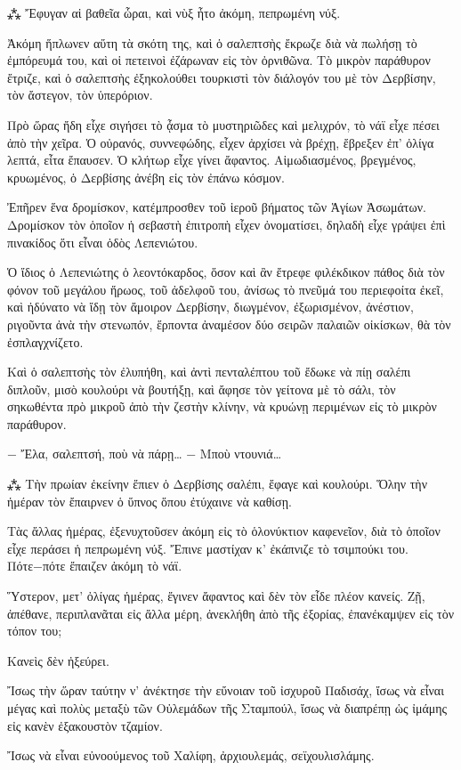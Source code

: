 \documentclass{article}
\begin{document}
⁂
Ἔφυγαν αἱ βαθεῖα ὧραι, καὶ νὺξ ἦτο ἀκόμη, πεπρωμένη νύξ.

Ἀκόμη ἥπλωνεν αὕτη τὰ σκότη της, καὶ ὁ σαλεπτσὴς ἔκρωζε διὰ νὰ πωλήσῃ τὸ ἐμπόρευμά του, καὶ οἱ πετεινοὶ ἐζάρωναν εἰς τὸν ὀρνιθῶνα. Τὸ μικρὸν παράθυρον ἔτριζε, καὶ ὁ σαλεπτσὴς ἐξηκολούθει τουρκιστὶ τὸν διάλογόν του μὲ τὸν Δερβίσην, τὸν ἄστεγον, τὸν ὑπερόριον.

Πρὸ ὥρας ἤδη εἶχε σιγήσει τὸ ᾆσμα τὸ μυστηριῶδες καὶ μελιχρόν, τὸ νάϊ εἶχε πέσει ἀπὸ τὴν χεῖρα. Ὁ οὐρανός, συννεφώδης, εἶχεν ἀρχίσει νὰ βρέχῃ, ἔβρεξεν ἐπ' ὀλίγα λεπτά, εἶτα ἔπαυσεν. Ὁ κλήτωρ εἶχε γίνει ἄφαντος. Αἱμωδιασμένος, βρεγμένος, κρυωμένος, ὁ Δερβίσης ἀνέβη εἰς τὸν ἐπάνω κόσμον.

Ἐπῆρεν ἕνα δρομίσκον, κατέμπροσθεν τοῦ ἱεροῦ βήματος τῶν Ἁγίων Ἀσωμάτων. Δρομίσκον τὸν ὁποῖον ἡ σεβαστὴ ἐπιτροπὴ εἶχεν ὀνοματίσει, δηλαδὴ εἶχε γράψει ἐπὶ πινακίδος ὅτι εἶναι ὁδὸς Λεπενιώτου.

Ὁ ἴδιος ὁ Λεπενιώτης ὁ λεοντόκαρδος, ὅσον καὶ ἂν ἔτρεφε φιλέκδικον πάθος διὰ τὸν φόνον τοῦ μεγάλου ἥρωος, τοῦ ἀδελφοῦ του, ἀνίσως τὸ πνεῦμά του περιεφοίτα ἐκεῖ, καὶ ἠδύνατο νὰ ἴδῃ τὸν ἄμοιρον Δερβίσην, διωγμένον, ἐξωρισμένον, ἀνέστιον, ριγοῦντα ἀνὰ τὴν στενωπόν, ἕρποντα ἀναμέσον δύο σειρῶν παλαιῶν οἰκίσκων, θὰ τὸν ἐσπλαγχνίζετο.

Καὶ ὁ σαλεπτσὴς τὸν ἐλυπήθη, καὶ ἀντὶ πενταλέπτου τοῦ ἔδωκε νὰ πίῃ σαλέπι διπλοῦν, μισὸ κουλούρι νὰ βουτήξῃ, καὶ ἄφησε τὸν γείτονα μὲ τὸ σάλι, τὸν σηκωθέντα πρὸ μικροῦ ἀπὸ τὴν ζεστὴν κλίνην, νὰ κρυώνῃ περιμένων εἰς τὸ μικρὸν παράθυρον.

− Ἔλα, σαλεπτσή, ποὺ νὰ πάρῃ…
− Μποὺ ντουνιά…

⁂
Τὴν πρωίαν ἐκείνην ἔπιεν ὁ Δερβίσης σαλέπι, ἔφαγε καὶ κουλούρι. Ὅλην τὴν ἡμέραν τὸν ἔπαιρνεν ὁ ὕπνος ὅπου ἐτύχαινε νὰ καθίσῃ.

Τὰς ἄλλας ἡμέρας, ἐξενυχτοῦσεν ἀκόμη εἰς τὸ ὁλονύκτιον καφενεῖον, διὰ τὸ ὁποῖον εἶχε περάσει ἡ πεπρωμένη νύξ. Ἔπινε μαστίχαν κ' ἐκάπνιζε τὸ τσιμπούκι του. Πότε−πότε ἔπαιζεν ἀκόμη τὸ νάϊ.

Ὕστερον, μετ' ὀλίγας ἡμέρας, ἔγινεν ἄφαντος καὶ δὲν τὸν εἶδε πλέον κανείς. Ζῇ, ἀπέθανε, περιπλανᾶται εἰς ἄλλα μέρη, ἀνεκλήθη ἀπὸ τῆς ἐξορίας, ἐπανέκαμψεν εἰς τὸν τόπον του;

Κανεὶς δὲν ἠξεύρει.

Ἴσως τὴν ὥραν ταύτην ν' ἀνέκτησε τὴν εὔνοιαν τοῦ ἰσχυροῦ Παδισάχ, ἴσως νὰ εἶναι μέγας καὶ πολὺς μεταξὺ τῶν Οὐλεμάδων τῆς Σταμπούλ, ἴσως νὰ διαπρέπῃ ὡς ἰμάμης εἰς κανὲν ἐξακουστὸν τζαμίον.

Ἴσως νὰ εἶναι εὐνοούμενος τοῦ Χαλίφη, ἀρχιουλεμάς, σεϊχουλισλάμης.
\end{document}
